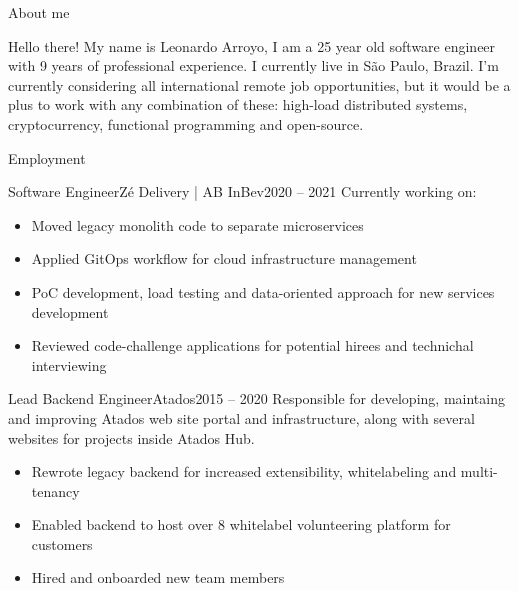 \documentclass[]{Arroyo}
\begin{document}
	\makeheader

	\begin{cvsection}{About me}
		\begin{cvsubsection}{}{}{}	
            Hello there! My name is Leonardo Arroyo, I am a 25 year old software engineer with 9 years of professional experience. I currently live in São Paulo, Brazil.
			I'm currently considering all international remote job opportunities, but it would be a plus to work with any combination of these: high-load distributed systems, cryptocurrency, functional programming and open-source.
		\end{cvsubsection}
      \end{cvsection}
	
	\begin{cvsection}{Employment}
		\begin{cvsubsection}{Software Engineer}{Zé Delivery | AB InBev}{2020 -- 2021}
            Currently working on:
			\begin{itemize}
                \item Moved legacy monolith code to separate microservices
                \item Applied GitOps workflow for cloud infrastructure management
                \item PoC development, load testing and data-oriented approach for new services development
                \item Reviewed code-challenge applications for potential hirees and technichal interviewing
			\end{itemize}
		\end{cvsubsection}
		
		\begin{cvsubsection}{Lead Backend Engineer}{Atados}{2015 -- 2020}	
            Responsible for developing, maintaing and improving Atados web site portal and infrastructure, along with several websites for projects inside Atados Hub.
			\begin{itemize}
                \item Rewrote legacy backend for increased extensibility, whitelabeling and multi-tenancy
                \item Enabled backend to host over 8 whitelabel volunteering platform for customers
                \item Hired and onboarded new team members
			\end{itemize}
		\end{cvsubsection}
		

\end{cvsection}
\end{document}
